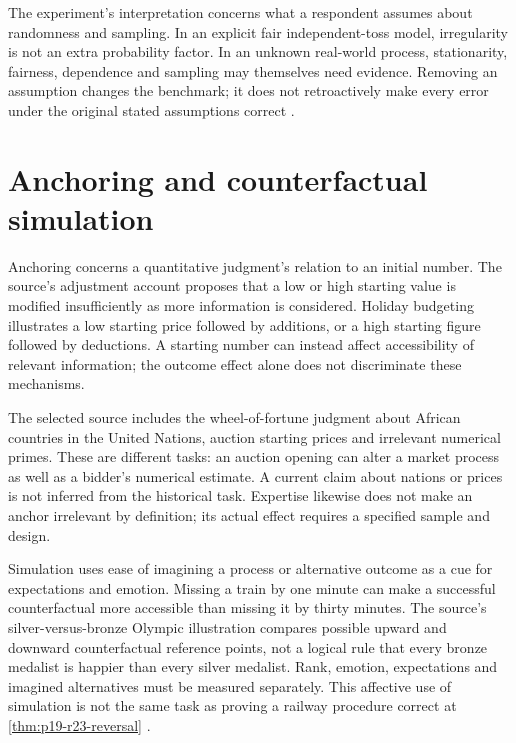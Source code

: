The experiment's interpretation concerns what a respondent assumes about
randomness and sampling. In an explicit fair independent-toss model,
irregularity is not an extra probability factor. In an unknown
real-world process, stationarity, fairness, dependence and sampling
may themselves need evidence. Removing an assumption changes the
benchmark; it does not retroactively make every error under the
original stated assumptions correct
\cite[pp.~160--161,166]{FiedlerPragerMcCaughey2021Heuristics}.

\section{Anchoring and counterfactual simulation}
\label{sec:p19-r24-anchoring-simulation}

Anchoring concerns a quantitative judgment's relation to an initial
number. The source's adjustment account proposes that a low or high
starting value is modified insufficiently as more information is
considered. Holiday budgeting illustrates a low starting price followed
by additions, or a high starting figure followed by deductions. A
starting number can instead affect accessibility of relevant information;
the outcome effect alone does not discriminate these mechanisms.

The selected source includes the wheel-of-fortune judgment about African
countries in the United Nations, auction starting prices and irrelevant
numerical primes. These are different tasks: an auction opening can
alter a market process as well as a bidder's numerical estimate. A
current claim about nations or prices is not inferred from the
historical task. Expertise likewise does not make an anchor irrelevant
by definition; its actual effect requires a specified sample and design.

Simulation uses ease of imagining a process or alternative outcome as
a cue for expectations and emotion. Missing a train by one minute can
make a successful counterfactual more accessible than missing it by
thirty minutes. The source's silver-versus-bronze Olympic illustration
compares possible upward and downward counterfactual reference points,
not a logical rule that every bronze medalist is happier than every
silver medalist. Rank, emotion, expectations and imagined alternatives
must be measured separately. This affective use of simulation is not
the same task as proving a railway procedure correct at
\cref{thm:p19-r23-reversal}
\cite[pp.~161--162]{FiedlerPragerMcCaughey2021Heuristics}.

